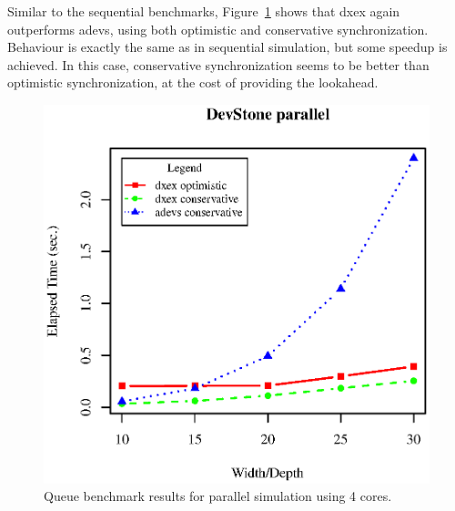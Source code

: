 Similar to the sequential benchmarks, Figure~\ref{fig:queue_benchmark_parallel} shows that dxex again outperforms adevs, using both optimistic and conservative synchronization.
Behaviour is exactly the same as in sequential simulation, but some speedup is achieved.
In this case, conservative synchronization seems to be better than optimistic synchronization, at the cost of providing the lookahead.

\begin{figure}
	\includegraphics[width=\columnwidth]{fig/fig2.eps}
	\caption{Queue benchmark results for parallel simulation using 4 cores.}
	\label{fig:queue_benchmark_parallel}
\end{figure}

